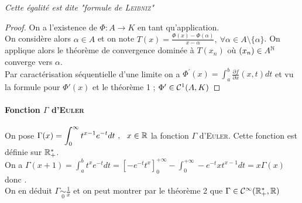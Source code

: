 	\textit{Cette égalité est dite "formule de \textsc{Leibniz}"} \medskip \\
	
	\begin{proof}
		On a l'existence de $\Phi :A\to K$ en tant qu'application.\\
		On considère alors $\alpha \in A$ et on note $T(x) = \frac{\Phi(x)-\Phi(\alpha)}{x-\alpha} ,~\forall \alpha\in A\setminus \{\alpha\}$. On applique alors le théorème de convergence dominée à $T(x_n)$ où $(x_n) \in A^{\mathbb{N}}$ converge vers $\alpha$.\\
		Par caractérisation séquentielle d'une limite on a $\Phi^\prime(x) = \int_a^b \frac{\partial f}{\partial x}(x,t) dt$ et vu la formule pour $\Phi'(x)$ et le théorème 1 ; $\Phi'\in{\mathcal{C}}^1(A,K)$
	\end{proof}
	
	\paragraph{Fonction $\Gamma$ d'\textsc{Euler}}
		On pose $\displaystyle{\Gamma(x) = \int_0^{\infty} t^{x-1}e^{-t} dt ~,~~x\in{\mathbb{R}}}$ la fonction $\Gamma$ d'\textsc{Euler}. Cette fonction est définie sur ${\mathbb{R}}_+^*$.\\
		On a $\Gamma(x+1) = \int_a^b t^xe^{-t}dt = [-e^{-t}t^x]_0^{+\infty} - \int_0^{+\infty} -e^{-t}xt^{x-1} dt = x\Gamma(x)$ donc  . \\ 
		On en déduit $\Gamma \underset{0}{\sim} \frac{1}{x}$ et on peut montrer par le théorème 2 que $\Gamma\in{\mathcal{C}}^{\infty}({\mathbb{R}}_+^*,{\mathbb{R}})$ \vspace*{0.5cm} \\ 
		
		
\fin
